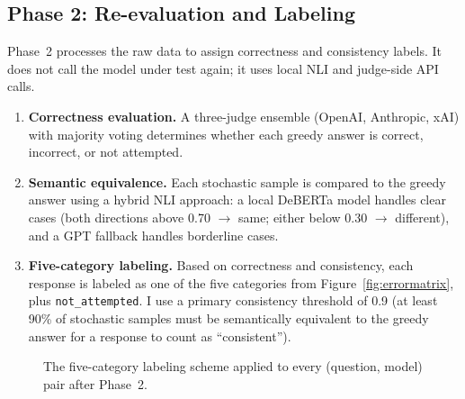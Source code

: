 \documentclass[11pt]{article}
\begin{document}
\subsection{Phase 2: Re-evaluation and Labeling}

Phase~2 processes the raw data to assign correctness and consistency labels. It does not call the model under test again; it uses local NLI and judge-side API calls.

\begin{enumerate}
    \item \textbf{Correctness evaluation.} A three-judge ensemble (OpenAI, Anthropic, xAI) with majority voting determines whether each greedy answer is correct, incorrect, or not attempted.
    \item \textbf{Semantic equivalence.} Each stochastic sample is compared to the greedy answer using a hybrid NLI approach: a local DeBERTa model handles clear cases (both directions above 0.70 $\rightarrow$ same; either below 0.30 $\rightarrow$ different), and a GPT fallback handles borderline cases.
    \item \textbf{Five-category labeling.} Based on correctness and consistency, each response is labeled as one of the five categories from Figure~\ref{fig:errormatrix}, plus \texttt{not\_attempted}. I use a primary consistency threshold of 0.9 (at least 90\% of stochastic samples must be semantically equivalent to the greedy answer for a response to count as ``consistent'').
\end{enumerate}

\begin{figure}[H]
\centering
{}
\caption{The five-category labeling scheme applied to every (question, model) pair after Phase~2.}
\label{fig:labels}
\end{figure}
\end{document}

